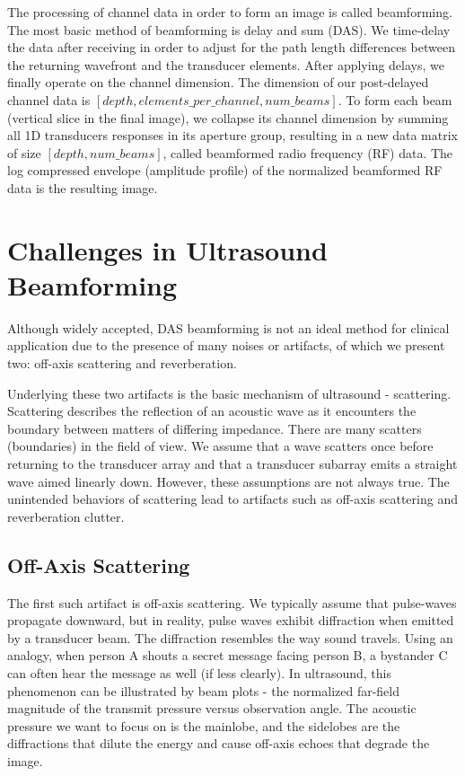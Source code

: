  The processing of channel data in order to form an image is called beamforming. The most basic method of beamforming is delay and sum (DAS). We time-delay the data after receiving in order to adjust for the path length differences between the returning wavefront and the transducer elements. After applying delays, we finally operate on the channel dimension. The dimension of our post-delayed channel data is $[depth, elements\_per\_channel, num\_beams]$. To form each beam (vertical slice in the final image), we collapse its channel dimension by summing all 1D transducers responses in its aperture group, resulting in a new data matrix of size $[depth, num\_beams]$, called beamformed radio frequency (RF) data. The log compressed envelope (amplitude profile) of the normalized beamformed RF data is the resulting image.


\section{Challenges in Ultrasound Beamforming}

Although widely accepted, DAS beamforming is not an ideal method for clinical application due to the presence of many noises or artifacts, of which we present two: off-axis scattering and reverberation.

Underlying these two artifacts is the basic mechanism of ultrasound - scattering. Scattering describes the reflection of an acoustic wave as it encounters the boundary between matters of differing impedance. There are many scatters (boundaries) in the field of view. We assume that a wave scatters once before returning to the transducer array and that a transducer subarray emits a straight wave aimed linearly down. However, these assumptions are not always true. The unintended behaviors of scattering lead to artifacts such as off-axis scattering and reverberation clutter. %


\subsection{Off-Axis Scattering}

The first such artifact is off-axis scattering. We typically assume that pulse-waves propagate downward, but in reality, pulse waves exhibit diffraction when emitted by a transducer beam. The diffraction resembles the way sound travels. Using an analogy, when person A shouts a secret message facing person B, a bystander C can often hear the message as well (if less clearly). In ultrasound, this phenomenon can be illustrated by beam plots - the normalized far-field magnitude of the transmit pressure versus observation angle. The acoustic pressure we want to focus on is the mainlobe, and the sidelobes are the diffractions that dilute the energy and cause off-axis echoes that degrade the image.


